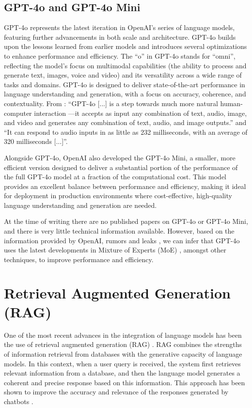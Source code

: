 \documentclass[a4paper,12pt,twoside]{ThesisStyle}
\begin{document}
\subsection{GPT-4o and GPT-4o Mini}
\label{subsec:gpt-4o}

GPT-4o \cite{gpt4o} represents the latest iteration in OpenAI's series of language models, featuring further advancements in both scale and architecture. GPT-4o builds upon the lessons learned from earlier models and introduces several optimizations to enhance performance and efficiency. The ``o'' in GPT-4o stands for ``omni'', reflecting the model's focus on multimodal capabilities (the ability to process and generate text, images, voice and video) and its versatility across a wide range of tasks and domains. GPT-4o is designed to deliver state-of-the-art performance in language understanding and generation, with a focus on accuracy, coherence, and contextuality. From \cite{gpt4o}: ``GPT-4o [...] is a step towards much more natural human-computer interaction —it accepts as input any combination of text, audio, image, and video and generates any combination of text, audio, and image outputs.'' and ``It can respond to audio inputs in as little as 232 milliseconds, with an average of 320 milliseconds [...]''.

Alongside GPT-4o, OpenAI also developed the GPT-4o Mini, a smaller, more efficient version designed to deliver a substantial portion of the performance of the full GPT-4o model at a fraction of the computational cost. This model provides an excellent balance between performance and efficiency, making it ideal for deployment in production environments where cost-effective, high-quality language understanding and generation are needed.

At the time of writing there are no published papers on GPT-4o or GPT-4o Mini, and there is very little technical information available. However, based on the information provided by OpenAI, rumors and leaks \cite{betts_moe_2023}, we can infer that GPT-4o uses the latest developments in Mixture of Experts (MoE) \cite{huggingface_moe_2023}, amongst other techniques, to improve performance and efficiency.

\section{Retrieval Augmented Generation (RAG)}
\label{sec:rag}

One of the most recent advances in the integration of language models has been the use of retrieval augmented generation (RAG) \cite{Lewis2021RetrievalAugmentedGeneration}. RAG combines the strengths of information retrieval from databases with the generative capacity of language models. In this context, when a user query is received, the system first retrieves relevant information from a database, and then the language model generates a coherent and precise response based on this information. This approach has been shown to improve the accuracy and relevance of the responses generated by chatbots \cite{Lewis2021RetrievalAugmentedGeneration}.
\end{document}
